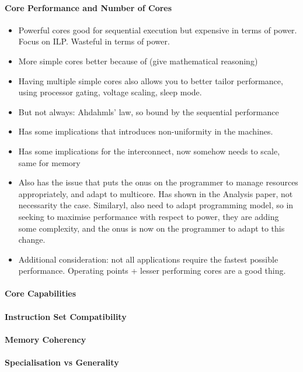 \paragraph{Core Performance and Number of Cores}
\begin{itemize}
\item Powerful cores good for sequential execution but expensive
in terms of power. Focus on ILP. Wasteful in terms of power. 
\item More simple cores better because of (give mathematical reasoning)
\item Having multiple simple cores also allows you to better tailor
performance, using processor gating, voltage scaling, sleep mode. 
\item But not always: Ahdahmls' law, so bound by the sequential performance
\item Has some implications that introduces non-uniformity in the machines. 
\item Has some implications for the interconnect, now somehow needs to scale,
same for memory 
\item Also has the issue that puts the onus on the programmer to manage 
resources appropriately, and adapt to multicore. Has shown in 
the Analysis paper, not necessarity the case. Similaryl, 
also need to adapt programming model, so in seeking to maximise 
performance with respect to power, they are adding some complexity, 
and the onus is now on the programmer to adapt to this change. 
\item Additional consideration: not all applications require the fastest
possible performance. Operating points + lesser performing cores
are a good thing. 
\end{itemize}
\paragraph{Core Capabilities}

\paragraph{Instruction Set Compatibility }
\paragraph{Memory Coherency}
\paragraph{Specialisation vs Generality}

